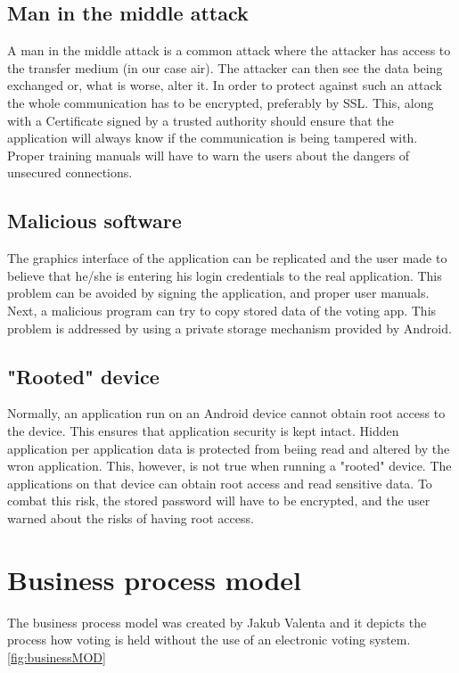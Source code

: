 \documentclass[11pt,twoside,a4paper]{book}
\begin{document}
\subsection{Man in the middle attack}
A man in the middle attack is a common attack where the attacker has access to the transfer medium (in our case air). The attacker can then see the data being exchanged or, what is worse, alter it. In order to protect against such an attack the whole communication has to be encrypted, preferably by SSL. This, along with a Certificate signed by a trusted authority should ensure that the application will always know if the communication is being tampered with. Proper training manuals will have to warn the users about the dangers of unsecured connections.
\subsection{Malicious software}
The graphics interface of the application can be replicated and the user made to believe that he/she is entering his login credentials to the real application. This problem can be avoided by signing the application, and proper user manuals.\\
Next, a malicious program can try to copy stored data of the voting app. This problem is addressed by using a private storage mechanism provided by Android. \cite{storageAnd}

\subsection{"Rooted" device}
Normally, an application run on an Android device cannot obtain root access to the device. This ensures that application security is kept intact. Hidden application per application data is protected from beiing read and altered by the wron application. This, however, is not true when running a "rooted" device. The applications on that device can obtain root access and read sensitive data. To combat this risk, the stored password will have to be encrypted, and the user warned about the risks of having root access.


\section{Business process model}
The business process model was created by Jakub Valenta and it depicts the process how voting is held without the use of an electronic voting system. \cite{bakalarkaJV} \ref{fig:businessMOD}
\end{document}
